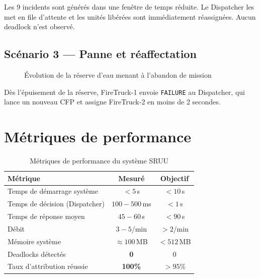 \documentclass[12pt, a4paper]{report}
\begin{document}
Les 9 incidents sont générés dans une fenêtre de temps réduite. Le Dispatcher les met
en file d'attente et les unités libérées sont immédiatement réassignées. Aucun deadlock
n'est observé.

\subsection{Scénario 3 — Panne et réaffectation}

\begin{figure}[H]
\centering
{}
\caption{Évolution de la réserve d'eau menant à l'abandon de mission}
\label{fig:water}
\end{figure}

Dès l'épuisement de la réserve, FireTruck-1 envoie \texttt{FAILURE} au Dispatcher, qui
lance un nouveau CFP et assigne FireTruck-2 en moins de 2 secondes.

\section{Métriques de performance}

\begin{table}[H]
\centering
\caption{Métriques de performance du système SRUU}
\begin{tabularx}{0.88\textwidth}{Xcc}
\toprule
\rowcolor{NavyCard!15}
\color{CyanNeon}Métrique & \color{CyanNeon}Mesuré & \color{CyanNeon}Objectif \\
\midrule
Temps de démarrage système     & $< 5$\,s       & $< 10$\,s \\
Temps de décision (Dispatcher) & $100{-}500$\,ms & $< 1$\,s \\
Temps de réponse moyen         & $45{-}60$\,s   & $< 90$\,s \\
Débit                          & $3{-}5$/min    & $> 2$/min \\
Mémoire système                & $\approx 100$\,MB & $< 512$\,MB \\
Deadlocks détectés             & \textbf{0}     & 0 \\
Taux d'attribution réussie     & \textbf{100\%} & $> 95\%$ \\
\bottomrule
\end{tabularx}
\end{table}
\end{document}
